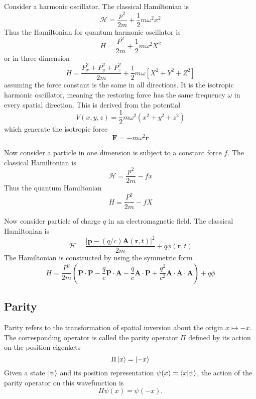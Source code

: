 \documentclass[../../../main.tex]{subfiles}
\begin{document}
Consider a harmonic oscillator.
The classical Hamiltonian is 
\begin{equation*}
    \mathcal{H }=\frac{p^2 }{2m }+\frac{1 }{2 }m\omega^2x^2
\end{equation*}
Thus the Hamiltonian for quantum harmonic oscillator is 
\begin{equation*}
    H=\frac{P^2 }{2m }+\frac{1 }{2 }m\omega^2X^2
\end{equation*}
or in three dimension
\begin{equation*}
    H=\frac{P_x^2+P_y^2+P_z^2}{2m  }+\frac{1 }{2}m\omega \left[ X^2+Y^2+Z^2 \right] 
\end{equation*}
assuming the force constant is the same in all directions.
It is the isotropic harmonic oscillator, meaning the restoring force has the same frequency $\omega$ in every spatial direction.
This is derived from the potential
\begin{equation*}
    V(x,y,z) = \frac{1}{2} m \omega^2 (x^2 + y^2 + z^2)
\end{equation*}
which generate the isotropic force 
\begin{equation*}
    \mathbf{F }= -m \omega^2 \mathbf{r}
\end{equation*}

Now consider a particle in one dimension is subject to a constant force $f$.
The classical Hamiltonian is 
\begin{equation*}
    \mathcal{H }=\frac{p^2 }{2m }-fx
\end{equation*}
Thus the quantum Hamiltonian  
\begin{equation*}
    H=\frac{P^2 }{2m }-fX
\end{equation*}

Now consider particle of charge $q$ in an electromagnetic field.
The classical Hamiltonian is 
\begin{equation*}
    \mathcal{H }=\frac{|\mathbf{p }-(q/c) \mathbf{A}(\mathbf{r},t)|^2 }{2m }+q\phi(\mathbf{r },t)
\end{equation*}
The Hamiltonian is constructed by using the symmetric form 
\begin{equation*}
    H=\frac{P^2 }{2m }\left( \mathbf{P }\cdot \mathbf{P }-\frac{q }{c }\mathbf{P }\cdot \mathbf{A}-\frac{q }{c}\mathbf{A}\cdot \mathbf{P}+\frac{q^2 }{c^2}\mathbf{A }\cdot \mathbf{A}\cdot \mathbf{A} \right) +q\phi
\end{equation*}

\subsection{Parity}
Parity refers to the transformation of spatial inversion about the origin $x \mapsto -x$. 
The corresponding operator is called the parity operator $\Pi$ defined by its action on the position eigenkets
\begin{equation*}
    \Pi \ket{x }=\ket{-x}
\end{equation*}
Given a state $\ket{\psi}$ and its position representation $\psi(x) = \braket{x|\psi}$, the action of the parity operator on this wavefunction is
\begin{equation*}
\Pi\psi(x) = \psi(-x) .
\end{equation*}
\end{document}
